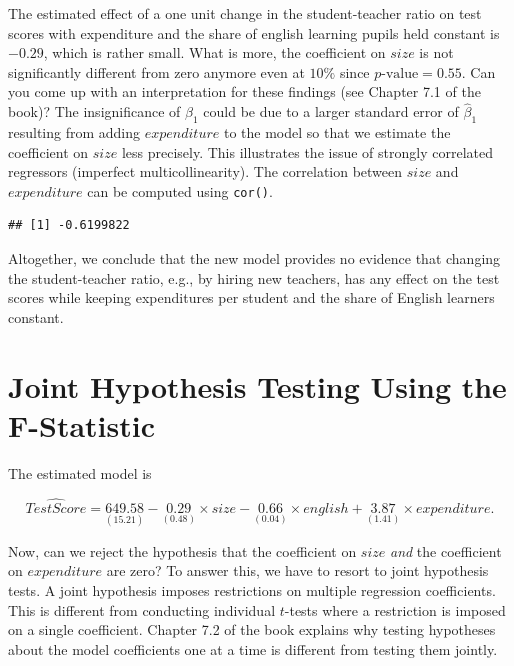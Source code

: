 \documentclass[]{book}
\newenvironment{Shaded}{\begin{snugshade}}{\end{snugshade}}
\newcommand{\KeywordTok}[1]{\textcolor[rgb]{0.13,0.29,0.53}{\textbf{#1}}}
\newcommand{\CommentTok}[1]{\textcolor[rgb]{0.56,0.35,0.01}{\textit{#1}}}
\newcommand{\OperatorTok}[1]{\textcolor[rgb]{0.81,0.36,0.00}{\textbf{#1}}}
\newcommand{\NormalTok}[1]{#1}
\theoremstyle{definition}
\theoremstyle{definition}
\theoremstyle{definition}
\theoremstyle{remark}
\begin{document}
The estimated effect of a one unit change in the student-teacher ratio
on test scores with expenditure and the share of english learning pupils
held constant is \(-0.29\), which is rather small. What is more, the
coefficient on \(size\) is not significantly different from zero anymore
even at \(10\%\) since \(p\text{-value}=0.55\). Can you come up with an
interpretation for these findings (see Chapter 7.1 of the book)? The
insignificance of \(\hat\beta_1\) could be due to a larger standard
error of \(\hat{\beta}_1\) resulting from adding \(expenditure\) to the
model so that we estimate the coefficient on \(size\) less precisely.
This illustrates the issue of strongly correlated regressors (imperfect
multicollinearity). The correlation between \(size\) and \(expenditure\)
can be computed using \texttt{cor()}.

\begin{Shaded}
\end{Shaded}

\begin{verbatim}
## [1] -0.6199822
\end{verbatim}

Altogether, we conclude that the new model provides no evidence that
changing the student-teacher ratio, e.g., by hiring new teachers, has
any effect on the test scores while keeping expenditures per student and
the share of English learners constant.

\section{Joint Hypothesis Testing Using the
F-Statistic}\label{joint-hypothesis-testing-using-the-f-statistic}

The estimated model is

\[ \widehat{TestScore} = \underset{(15.21)}{649.58} -\underset{(0.48)}{0.29} \times size - \underset{(0.04)}{0.66} \times english + \underset{(1.41)}{3.87} \times expenditure. \]

Now, can we reject the hypothesis that the coefficient on \(size\)
\emph{and} the coefficient on \(expenditure\) are zero? To answer this,
we have to resort to joint hypothesis tests. A joint hypothesis imposes
restrictions on multiple regression coefficients. This is different from
conducting individual \(t\)-tests where a restriction is imposed on a
single coefficient. Chapter 7.2 of the book explains why testing
hypotheses about the model coefficients one at a time is different from
testing them jointly.
\end{document}
